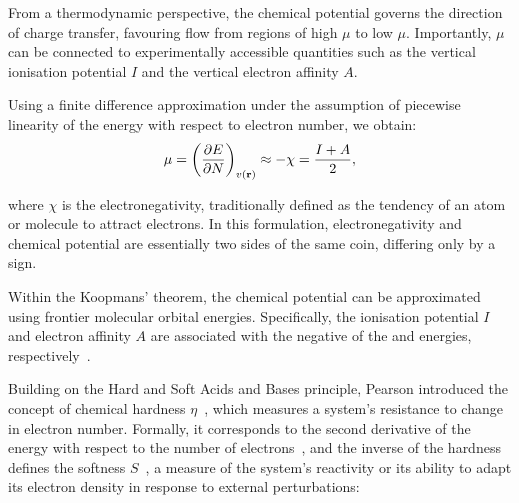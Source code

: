 \newpage
From a thermodynamic perspective, the chemical potential governs the direction
of charge transfer, favouring flow from regions of high $\mu$ to low $\mu$.
Importantly, $\mu$ can be connected to experimentally accessible quantities
such as the vertical ionisation potential $I$ and the vertical electron
affinity $A$.

\vspace{1em}%
Using a finite difference approximation under the assumption of piecewise
linearity of the energy with respect to electron number, we obtain:
%
\begin{align}
  \mu = \left(\pdv{E}{N}\right)_{v(\mathbf{r})}
    \approx -\chi = \frac{I + A}2,
\end{align}

\noindent where $\chi$ is the electronegativity, traditionally defined as the
tendency of an atom or molecule to attract electrons. In this formulation,
electronegativity and chemical potential are essentially two sides of the same
coin, differing only by a sign.

\vspace{1em}%
Within the Koopmans' theorem, the chemical potential can be
approximated using frontier molecular orbital energies. Specifically, the
ionisation potential $I$ and electron affinity $A$ are associated with the
negative of the \homo and \lumo energies,
respectively~\cite{Pearson1986}.


\newpage
Building on the Hard and Soft Acids and Bases principle, Pearson introduced the
concept of chemical hardness $\eta$~\cite{Pearson1997}, which measures a
system's resistance to change in electron number. Formally, it corresponds to
the second derivative of the energy with respect to the number of
electrons~\cite{Parr1983}, and the inverse of the hardness
defines the softness $S$~\cite{Yang1985}, a measure of
the system's reactivity or its ability to adapt its electron density in
response to external perturbations:

\vspace{1em}%

